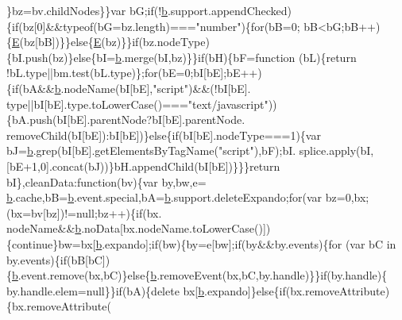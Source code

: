 \begin{DoxyCode}
      \}bz=bv.childNodes\}\}var bG;\textcolor{keywordflow}{if}(!\hyperlink{jquery_8js_aa4026ad5544b958e54ce5e106fa1c805}{b}.support.appendChecked)\{\textcolor{keywordflow}{if}(bz[0]&&typeof(bG=bz.length)===\textcolor{stringliteral}{"number"})\{\textcolor{keywordflow}{for}(bB=0;
      bB<bG;bB++)\{\hyperlink{_l_c_d_8c_a07484107e6d9fdf38b53edf631d6511d}{E}(bz[bB])\}\}\textcolor{keywordflow}{else}\{\hyperlink{_l_c_d_8c_a07484107e6d9fdf38b53edf631d6511d}{E}(bz)\}\}\textcolor{keywordflow}{if}(bz.nodeType)\{bI.push(bz)\}\textcolor{keywordflow}{else}\{bI=\hyperlink{jquery_8js_aa4026ad5544b958e54ce5e106fa1c805}{b}.merge(bI,bz)\}\}\textcolor{keywordflow}{if}(bH)\{bF=\textcolor{keyword}{function}
      (bL)\{\textcolor{keywordflow}{return} !bL.type||bm.test(bL.type)\};\textcolor{keywordflow}{for}(bE=0;bI[bE];bE++)\{\textcolor{keywordflow}{if}(bA&&\hyperlink{jquery_8js_aa4026ad5544b958e54ce5e106fa1c805}{b}.nodeName(bI[bE],\textcolor{stringliteral}{"script"})&&(!bI[bE].
      type||bI[bE].type.toLowerCase()===\textcolor{stringliteral}{"text/javascript"}))\{bA.push(bI[bE].parentNode?bI[bE].parentNode.
      removeChild(bI[bE]):bI[bE])\}\textcolor{keywordflow}{else}\{\textcolor{keywordflow}{if}(bI[bE].nodeType===1)\{var bJ=\hyperlink{jquery_8js_aa4026ad5544b958e54ce5e106fa1c805}{b}.grep(bI[bE].getElementsByTagName(\textcolor{stringliteral}{"script"}),bF);bI.
      splice.apply(bI,[bE+1,0].concat(bJ))\}bH.appendChild(bI[bE])\}\}\}\textcolor{keywordflow}{return} bI\},cleanData:\textcolor{keyword}{function}(bv)\{var by,bw,e=
      \hyperlink{jquery_8js_aa4026ad5544b958e54ce5e106fa1c805}{b}.cache,bB=\hyperlink{jquery_8js_aa4026ad5544b958e54ce5e106fa1c805}{b}.event.special,bA=\hyperlink{jquery_8js_aa4026ad5544b958e54ce5e106fa1c805}{b}.support.deleteExpando;\textcolor{keywordflow}{for}(var bz=0,bx;(bx=bv[bz])!=null;bz++)\{\textcolor{keywordflow}{if}(bx.
      nodeName&&\hyperlink{jquery_8js_aa4026ad5544b958e54ce5e106fa1c805}{b}.noData[bx.nodeName.toLowerCase()])\{\textcolor{keywordflow}{continue}\}bw=bx[\hyperlink{jquery_8js_aa4026ad5544b958e54ce5e106fa1c805}{b}.expando];\textcolor{keywordflow}{if}(bw)\{by=e[bw];\textcolor{keywordflow}{if}(by&&by.events)\{\textcolor{keywordflow}{for}
      (var bC in by.events)\{\textcolor{keywordflow}{if}(bB[bC])\{\hyperlink{jquery_8js_aa4026ad5544b958e54ce5e106fa1c805}{b}.event.remove(bx,bC)\}\textcolor{keywordflow}{else}\{\hyperlink{jquery_8js_aa4026ad5544b958e54ce5e106fa1c805}{b}.removeEvent(bx,bC,by.handle)\}\}\textcolor{keywordflow}{if}(by.handle)\{
      by.handle.elem=null\}\}\textcolor{keywordflow}{if}(bA)\{\textcolor{keyword}{delete} bx[\hyperlink{jquery_8js_aa4026ad5544b958e54ce5e106fa1c805}{b}.expando]\}\textcolor{keywordflow}{else}\{\textcolor{keywordflow}{if}(bx.removeAttribute)\{bx.removeAttribute(

\end{DoxyCode}
